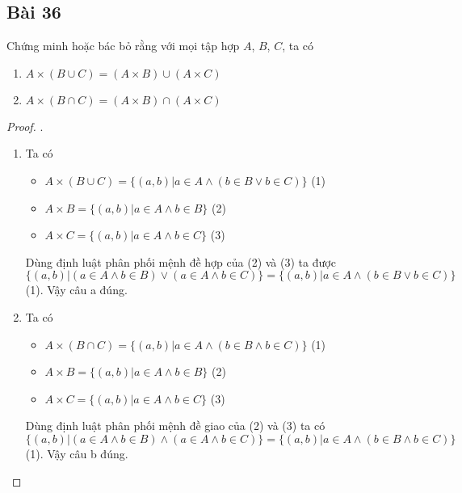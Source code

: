 \subsection*{Bài 36}
Chứng minh hoặc bác bỏ rằng với mọi tập hợp $A$, $B$, $C$, ta có
\begin{enumerate}[label=\alph*)]
    \item $A\times(B\cup C)=(A\times B)\cup(A\times C)$
    \item $A\times(B\cap C)=(A\times B)\cap(A\times C)$
\end{enumerate}
\begin{proof}.
    \begin{enumerate}[label=\alph*)]
        \item Ta có \begin{itemize}
            \item $A\times(B\cup C)=\{(a,b)|a\in A\land (b\in B\lor b\in C)\}$ (1)
            \item $A\times B=\{(a,b)|a\in A\land b\in B\}$ (2)
            \item $A\times C=\{(a,b)|a\in A\land b\in C\}$ (3)
        \end{itemize}
        Dùng định luật phân phối mệnh đề hợp của (2) và (3) ta được $\{(a,b)|(a\in A\land b\in B)\lor(a\in A\land b\in C)\}=\{(a,b)|a\in A\land (b\in B\lor b\in C)\}$ (1). Vậy câu a đúng.
        \item Ta có \begin{itemize}
            \item $A\times(B\cap C)=\{(a,b)|a\in A\land (b\in B\land b\in C)\}$ (1)
            \item $A\times B=\{(a,b)|a\in A\land b\in B\}$ (2)
            \item $A\times C=\{(a,b)|a\in A\land b\in C\}$ (3)
        \end{itemize}
        Dùng định luật phân phối mệnh đề giao của (2) và (3) ta có $\{(a,b)|(a\in A\land b\in B)\land(a\in A\land b\in C)\}=\{(a,b)|a\in A\land (b\in B\land b\in C)\}$ (1). Vậy câu b đúng.
    \end{enumerate}
\end{proof}
